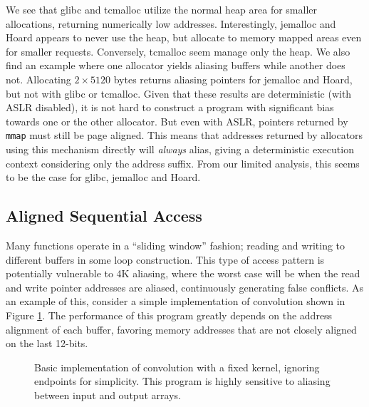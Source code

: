 \documentclass[prodmode,acmtaco]{acmsmall}
\begin{document}
We see that glibc and tcmalloc utilize the normal heap area for smaller allocations, returning numerically low addresses. %
Interestingly, jemalloc and Hoard appears to never use the heap, but allocate to memory mapped areas even for smaller requests.
Conversely, tcmalloc seem manage only the heap.
We also find an example where one allocator yields aliasing buffers while another does not.
Allocating $2 \times 5120$ bytes returns aliasing pointers for jemalloc and Hoard, but not with glibc or tcmalloc.
Given that these results are deterministic (with ASLR disabled), it is not hard to construct a program with significant bias towards one or the other allocator.
But even with ASLR, pointers returned by \texttt{mmap} must still be page aligned.
This means that addresses returned by allocators using this mechanism directly will \emph{always} alias, giving a deterministic execution context considering only the address suffix.
From our limited analysis, this seems to be the case for glibc, jemalloc and Hoard.


\subsection{Aligned Sequential Access}
Many functions operate in a ``sliding window'' fashion; reading and writing to different buffers in some loop construction.
This type of access pattern is potentially vulnerable to 4K aliasing, where the worst case will be when the read and write pointer addresses are aliased, continuously generating false conflicts.
As an example of this, consider a simple implementation of convolution shown in Figure \ref{lst:conv}.
The performance of this program greatly depends on the address alignment of each buffer, favoring memory addresses that are not closely aligned on the last 12-bits.

\begin{figure}[t]
  \centering
  
  \caption{Basic implementation of convolution with a fixed kernel, ignoring endpoints for simplicity. This program is highly sensitive to aliasing between input and output arrays.}
  \label{lst:conv}
\end{figure}
\end{document}
